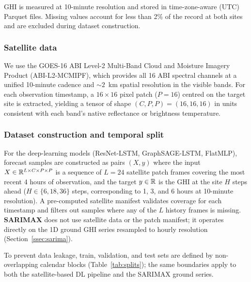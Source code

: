 GHI is measured at 10-minute resolution and stored in time-zone-aware (UTC) Parquet
files. Missing values account for less than 2\% of the record at both sites and are
excluded during dataset construction.

\subsubsection{Satellite data}

We use the GOES-16 ABI Level-2 Multi-Band Cloud and Moisture Imagery Product
(ABI-L2-MCMIPF), which provides all 16 ABI spectral channels at a unified
10-minute cadence and ${\sim}2$~km spatial resolution in the visible bands.
For each observation timestamp, a $16 \times 16$ pixel patch ($P = 16$) centred
on the target site is extracted, yielding a tensor of shape $(C, P, P) = (16, 16, 16)$
in units consistent with each band's native reflectance or brightness temperature.

\subsubsection{Dataset construction and temporal split}

For the deep-learning models (ResNet-LSTM, GraphSAGE-LSTM, FlatMLP), forecast
samples are constructed as pairs $(X, y)$ where the input
$X \in \mathbb{R}^{L \times C \times P \times P}$ is a sequence of $L = 24$ satellite
patch frames covering the most recent 4 hours of observation, and the target
$y \in \mathbb{R}$ is the GHI at the site $H$ steps ahead ($H \in \{6, 18, 36\}$ steps,
corresponding to 1, 3, and 6 hours at 10-minute resolution).
A pre-computed satellite manifest validates coverage for each timestamp and
filters out samples where any of the $L$ history frames is missing.
\textbf{SARIMAX} does not use satellite data or the patch manifest; it operates
directly on the 1D ground GHI series resampled to hourly resolution
(Section~\ref{ssec:sarima}).

To prevent data leakage, train, validation, and test sets are defined by
non-overlapping calendar blocks (Table~\ref{tab:splits}); the same boundaries
apply to both the satellite-based DL pipeline and the SARIMAX ground series.

